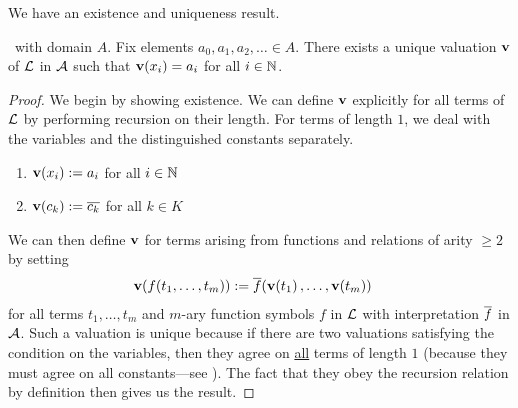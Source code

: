 We have an existence and uniqueness result.
\begin{boxlemma}\label{Ch2:Lemma:Valuation_Existence_Uniqueness}
    \ with domain $A$. Fix elements $a_0, a_1, a_2, \ldots \in A$. There exists a unique valuation $\mathbf{v}$ of $\mathcal{L}$ in $\mathcal{A}$ such that $\mathbf{v}\!\left( x_i \right) = a_i$ for all $i \in \mathbb{N}$.
\end{boxlemma}
\begin{proof}
    We begin by showing existence. We can define $\mathbf{v}$ explicitly for all terms of $\mathcal{L}$ by performing recursion on their length. For terms of length $1$, we deal with the variables and the distinguished constants separately.
    \begin{enumerate}
        \item $\mathbf{v}\!\left( x_i \right) := a_i$ for all $i \in \mathbb{N}$
        \item $\mathbf{v}\!\left( c_k \right) := \overline{c_k}$ for all $k \in K$
    \end{enumerate}
    We can then define $\mathbf{v}$ for terms arising from functions and relations of arity $\geq 2$ by setting
    \begin{align*}
        \mathbf{v}\!\left( f\!\left( t_1, \ldots, t_m \right) \right) &:= \overline{f}\!\left( \mathbf{v}\!\left( t_1 \right), \ldots, \mathbf{v}\!\left( t_m \right) \right)
    \end{align*}
    for all terms $t_1, \ldots, t_m$ and $m$-ary function symbols $f$ in $\mathcal{L}$ with interpretation $\overline{f}$ in $\mathcal{A}$. Such a valuation is unique because if there are two valuations satisfying the condition on the variables, then they agree on \underline{all} terms of length $1$ (because they must agree on all constants---see ). The fact that they obey the recursion relation by definition then gives us the result.
\end{proof}

